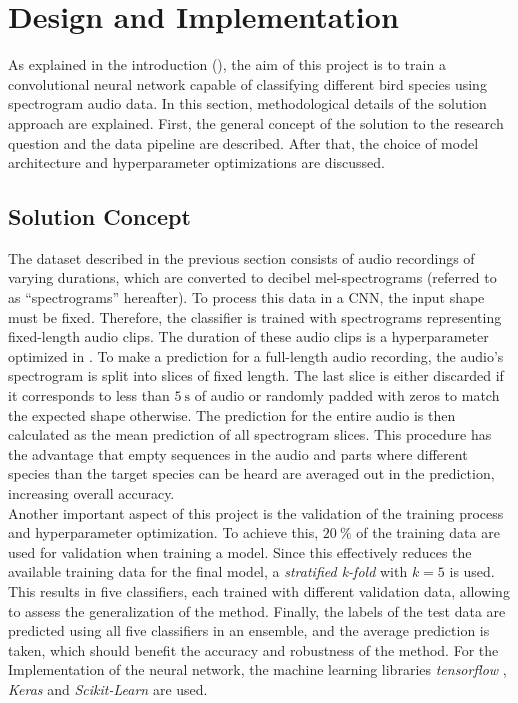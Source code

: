 \section{Design and Implementation}
\label{sec:strategy}
As explained in the introduction (), the aim of this project is to train a convolutional neural network capable of classifying different bird species 
using spectrogram audio data. In this section, methodological details of the solution approach are explained. First, the general concept of the solution to the research question 
and the data pipeline are described. After that, the choice of model architecture and hyperparameter optimizations are discussed.

\subsection{Solution Concept}
\label{subsec:concept}
The dataset described in the previous section consists of audio recordings of varying durations, which are converted to decibel mel-spectrograms 
(referred to as \enquote{spectrograms} hereafter). To process this data in a CNN, the input shape must be fixed. 
Therefore, the classifier is trained with spectrograms representing fixed-length audio clips. The duration of these audio clips is a hyperparameter 
optimized in . To make a prediction for a full-length audio recording, the audio's spectrogram is split into slices of fixed length. 
The last slice is either discarded if it corresponds to less than $\qty{5}{\second}$ of audio or randomly padded with zeros to match the expected shape otherwise. 
The prediction for the entire audio is then calculated as the mean prediction of all spectrogram slices. This procedure has the advantage that empty sequences in the audio and parts 
where different species than the target species can be heard are averaged out in the prediction, increasing overall accuracy. \\
Another important aspect of this project is the validation of the training process and hyperparameter optimization. To achieve this, $\qty{20}{\percent}$ of the training data are
used for validation when training a model. Since this effectively reduces the available training data for the final model, a \textit{stratified k-fold} with $k = 5$ is used. 
This results in five classifiers, each trained with different validation data, allowing to assess the generalization of the method. 
Finally, the labels of the test data are predicted using all five classifiers in an ensemble, and the average prediction is taken, which should benefit 
the accuracy and robustness of the method. For the Implementation of the neural network, the machine learning libraries \textit{tensorflow} \cite{tensorflow}, \textit{Keras}
\cite{keras} and \textit{Scikit-Learn} \cite{scikit-learn} are used.

